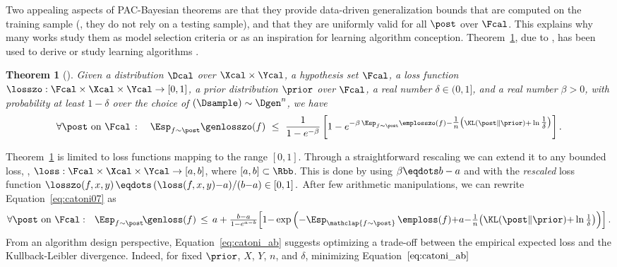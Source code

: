\documentclass{article}
\newtheorem{thm}{Theorem}
\theoremstyle{definition}
\theoremstyle{plain}
\begin{document}
Two appealing aspects of PAC-Bayesian theorems are that they provide data-driven generalization bounds that are computed on the training sample  (\ie, they do not rely on a testing sample), and that they are uniformly valid for all $\post$ over $\Fcal$. This explains why  many works study them as model selection criteria or as an inspiration for learning algorithm conception. Theorem~\ref{thm:pacbayescatoni}, due to \citet{catoni-07}, has been used to derive or study learning algorithms \citep{graal-icml09,hazan-13,mcallester&keshet-11,noy-14}. 
\begin{thm}[\citet{catoni-07}] 
	\label{thm:pacbayescatoni}
	Given a distribution $\Dcal$ over  $\Xcal   \times   \Ycal$, a hypothesis set $\Fcal$, a loss function $\losszo:\Fcal\times\Xcal\times\Ycal\to[0,1]$,   a prior distribution $\prior$ over $\Fcal$, a real number $\delta \in (0,1]$, and a real number $\beta>0$,  with probability at least $1 - \delta$ over the choice of $(\Dsample) \sim  \Dgen^n $,  we have
	\begin{equation} \label{eq:catoni07}
	\forall \mbox{$\post$ on $\Fcal$}\,:\quad
	\Esp_{f\sim\post} \genlosszo(f) \ \leq\ 
	\frac{1}{1 - e^{-\beta}}    \left[1 - e^{ -\beta\,\Esp_{f\sim\post} \emplosszo(f){-}\tfrac1n\big(\KL(\post\|\prior) {+} \ln  \tfrac{1}{\delta}\big)}\right] .
	\end{equation}
\end{thm}
%
%
Theorem~\ref{thm:pacbayescatoni} is limited to loss functions mapping to the range $[0,1]$.  
Through a straightforward rescaling we can extend it to any bounded loss, \ie, $\loss:\Fcal\times\Xcal\times\Ycal\to[a,b]$, where $[a,b]\subset\Rbb$. This is done by 
%
using 
$\beta\eqdots b-a$ and with the \emph{rescaled}  loss function
$\losszo (f,x,y) \,\eqdots\, {(\loss(f,x,y){-}a)}/{(b{-}a)}\in[0,1]\,.$
After few arithmetic manipulations, we can rewrite Equation~\eqref{eq:catoni07} as
\begin{eqnarray}\label{eq:catoni_ab}
	\forall \mbox{$\post$ on $\Fcal$} :\ \ 
	\Esp_{f\sim\post}\! \genloss(f) \,\leq\, a+\tfrac{b-a}{1 - e^{a-b}}    \Big[1 {-} \exp\Big({ -\Esp_{\mathclap{f\sim\post}}\, \emploss(f)  {+}a{-}\tfrac1n\big(\KL(\post\|\prior) {+} \ln  \tfrac{1}{\delta}\big)}\Big)\Big]\,.
\end{eqnarray}
%
From an algorithm design perspective, Equation~\eqref{eq:catoni_ab} suggests optimizing a trade-off between the empirical expected loss and the Kullback-Leibler divergence. Indeed,
for fixed $\prior$, $X$, $Y$, $n$, and $\delta$, minimizing Equation~$\eqref{eq:catoni_ab}$
\end{document}
